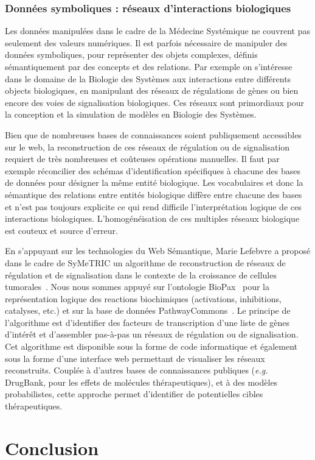 \documentclass[a4paper,10pt]{article}
\theoremstyle{definition}
\begin{document}
\subsubsection{Données symboliques : réseaux d'interactions biologiques} 
Les données manipulées dans le cadre de la Médecine Systémique ne couvrent pas seulement des valeurs numériques. Il est parfois nécessaire de manipuler des données symboliques, pour représenter des objets complexes, définis sémantiquement par des concepts et des relations. Par exemple on s'intéresse dans le domaine de la Biologie des Systèmes aux interactions entre différents objects biologiques, en manipulant des réseaux de régulations de gènes ou bien encore des voies de signalisation biologiques. Ces réseaux sont primordiaux pour la conception et la simulation de modèles en Biologie des Systèmes. 

Bien que de nombreuses bases de connaissances soient publiquement accessibles sur le web, la reconstruction de ces réseaux de régulation ou de signalisation requiert de très nombreuses et coûteuses opérations manuelles. Il faut par exemple réconcilier des schémas d'identification spécifiques à chacune des bases de données pour désigner la même entité biologique. Les vocabulaires et donc la sémantique des relations entre entités biologique diffère entre chacune des bases et n'est pas toujours explicite ce qui rend difficile l'interprétation logique de ces interactions biologiques. L'homogénéisation de ces multiples réseaux biologique est couteux et source d'erreur. 

En s'appuyant sur les technologies du Web Sémantique, Marie Lefebvre a proposé dans le cadre de SyMeTRIC un algorithme de reconstruction de réseaux de régulation et de signalisation dans le contexte de la croissance de cellules tumorales~\cite{jobim17}. Nous nous sommes appuyé sur l'ontologie BioPax~\cite{biopax} pour la représentation logique des reactions biochimiques (activations, inhibitions, catalyses, etc.) et sur la base de données PathwayCommons~\cite{pathwaycommons}. Le principe de l'algorithme est d'identifier des facteurs de transcription d'une liste de gènes d'intérêt et d'assembler pas-à-pas un réseaux de régulation ou de signalisation. Cet algorithme est disponible sous la forme de code informatique et également sous la forme d'une interface web permettant de visualiser les réseaux reconstruits. Couplée à d'autres bases de connaissances publiques ({\em e.g.} DrugBank, pour les effets de molécules thérapeutiques), et à des modèles probabilistes, cette approche permet d'identifier de potentielles cibles thérapeutiques. 

\section{Conclusion}


\end{document}
